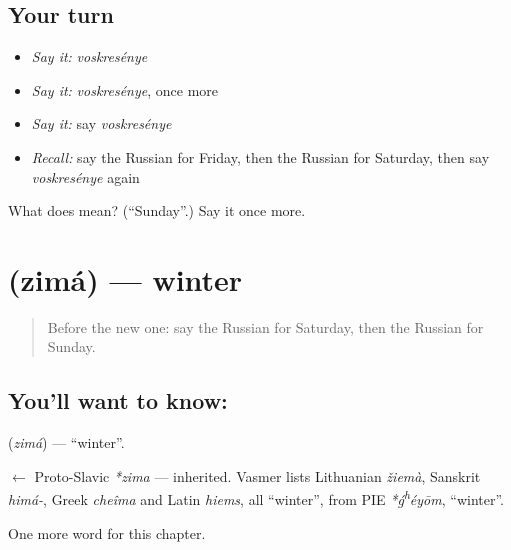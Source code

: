 \subsection*{Your turn}
\begin{itemize}
\raggedright
  \item \emph{Say it:} \emph{voskresénye}
  \item \emph{Say it:} \emph{voskresénye}, once more
  \item \emph{Say it:} say \emph{voskresénye}
  \item \emph{Recall:} say the Russian for Friday, then the Russian for Saturday, then say \emph{voskresénye} again
\end{itemize}

\begin{tcolorbox}[breakable,colback=teal!4,colframe=teal!35!black,title={Before you move on}]
What does  mean? (\textquotedblleft{}Sunday\textquotedblright{}.) Say it once more.
\end{tcolorbox}
\section[\texorpdfstring{\ru{зима} (zimá)}{зима (zimá)}]{ (zimá) — winter}

\label{lesson:RU-C71-winter}



\begin{quote}
Before the new one: say the Russian for Saturday, then the Russian for Sunday.
\end{quote}

\subsection*{You'll want to know: }
\textbf{} (\emph{zimá}) — \textquotedblleft{}winter\textquotedblright{}.

\begin{cousinweb}
\textbf{} $\leftarrow$ Proto-Slavic \emph{*zima} — inherited. Vasmer lists Lithuanian \emph{žiemà}, Sanskrit \emph{himá-}, Greek \emph{cheîma} and Latin \emph{hiems}, all \textquotedblleft{}winter\textquotedblright{}, from PIE \emph{*ǵ\textsuperscript{h}éyōm}, \textquotedblleft{}winter\textquotedblright{}.
\end{cousinweb}

\begin{grammarlens}[title={What you've built}]
One more word for this chapter.
\end{grammarlens}

